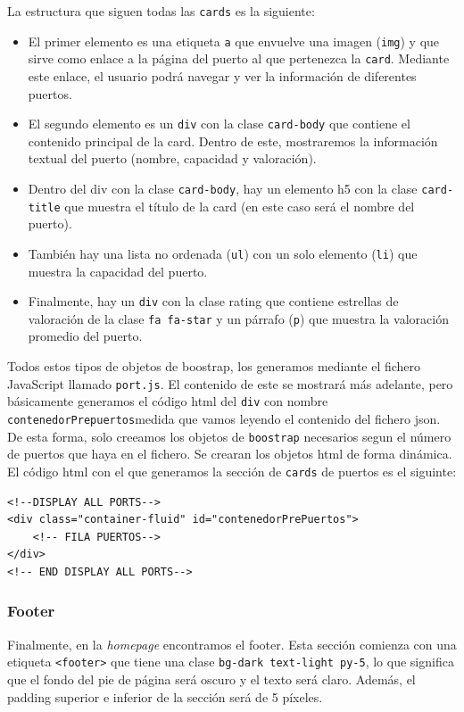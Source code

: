 \documentclass{article}
\begin{document}
\noindent La estructura que siguen todas las \texttt{cards} es la siguiente:
\begin{itemize}
    \item El primer elemento es una etiqueta \texttt{a} que envuelve una imagen (\texttt{img}) y que sirve como enlace a la página del puerto al que pertenezca la \texttt{card}. Mediante este enlace, el usuario podrá navegar y ver la información de diferentes puertos.
    \item El segundo elemento es un \texttt{div} con la clase \texttt{card-body} que contiene el contenido principal de la card. Dentro de este, mostraremos la información textual del puerto (nombre, capacidad y valoración).
    \item Dentro del div con la clase \texttt{card-body}, hay un elemento h5 con la clase \texttt{card-title} que muestra el título de la card (en este caso será el nombre del puerto).
    \item También hay una lista no ordenada (\texttt{ul}) con un solo elemento (\texttt{li}) que muestra la capacidad del puerto.
    \item Finalmente, hay un \texttt{div} con la clase rating que contiene estrellas de valoración de la clase \texttt{fa fa-star} y un párrafo (\texttt{p}) que muestra la valoración promedio del puerto.
\end{itemize}

Todos estos tipos de objetos de boostrap, los generamos mediante el fichero JavaScript llamado \texttt{port.js}. El contenido de este se mostrará más adelante, pero básicamente generamos el código html del \texttt{div} con nombre \texttt{contenedorPrepuertos}medida que vamos leyendo el contenido del fichero json. De esta forma, solo creeamos los objetos de \texttt{boostrap} necesarios segun el número de puertos que haya en el fichero. Se crearan los objetos html de forma dinámica.\\

\noindent El código html con el que generamos la sección de \texttt{cards} de puertos es el siguinte:
\begin{verbatim}
<!--DISPLAY ALL PORTS-->
<div class="container-fluid" id="contenedorPrePuertos">
    <!-- FILA PUERTOS-->
</div>
<!-- END DISPLAY ALL PORTS-->
\end{verbatim}

\subsubsection{Footer}
Finalmente, en la \textit{homepage} encontramos el footer. Esta sección comienza con una etiqueta \texttt{<footer>} que tiene una clase \texttt{bg-dark text-light py-5}, lo que significa que el fondo del pie de página será oscuro y el texto será claro. Además, el padding superior e inferior de la sección será de 5 píxeles.\\
\end{document}
